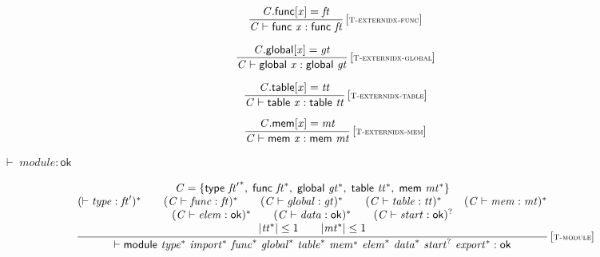 $$
\begin{array}{@{}c@{}}\displaystyle
\frac{
{\mathit{C}}.\mathsf{func}{}[{\mathit{x}}] = {\mathit{ft}}
}{
{\mathit{C}} \vdash \mathsf{func}~{\mathit{x}} : \mathsf{func}~{\mathit{ft}}
} \, {[\textsc{\scriptsize T{-}externidx{-}func}]}
\qquad
\end{array}
$$

$$
\begin{array}{@{}c@{}}\displaystyle
\frac{
{\mathit{C}}.\mathsf{global}{}[{\mathit{x}}] = {\mathit{gt}}
}{
{\mathit{C}} \vdash \mathsf{global}~{\mathit{x}} : \mathsf{global}~{\mathit{gt}}
} \, {[\textsc{\scriptsize T{-}externidx{-}global}]}
\qquad
\end{array}
$$

$$
\begin{array}{@{}c@{}}\displaystyle
\frac{
{\mathit{C}}.\mathsf{table}{}[{\mathit{x}}] = {\mathit{tt}}
}{
{\mathit{C}} \vdash \mathsf{table}~{\mathit{x}} : \mathsf{table}~{\mathit{tt}}
} \, {[\textsc{\scriptsize T{-}externidx{-}table}]}
\qquad
\end{array}
$$

$$
\begin{array}{@{}c@{}}\displaystyle
\frac{
{\mathit{C}}.\mathsf{mem}{}[{\mathit{x}}] = {\mathit{mt}}
}{
{\mathit{C}} \vdash \mathsf{mem}~{\mathit{x}} : \mathsf{mem}~{\mathit{mt}}
} \, {[\textsc{\scriptsize T{-}externidx{-}mem}]}
\qquad
\end{array}
$$

\vspace{1ex}

$\boxed{{ \vdash }\;{\mathit{module}} : \mathsf{ok}}$

$$
\begin{array}{@{}c@{}}\displaystyle
\frac{
\begin{array}{@{}c@{}}
{\mathit{C}} = \{ \begin{array}[t]{@{}l@{}}
\mathsf{type}~{{\mathit{ft}'}^\ast},\; \mathsf{func}~{{\mathit{ft}}^\ast},\; \mathsf{global}~{{\mathit{gt}}^\ast},\; \mathsf{table}~{{\mathit{tt}}^\ast},\; \mathsf{mem}~{{\mathit{mt}}^\ast} \}\end{array}
 \\
({ \vdash }\;{\mathit{type}} : {\mathit{ft}'})^\ast
 \qquad
({\mathit{C}} \vdash {\mathit{func}} : {\mathit{ft}})^\ast
 \qquad
({\mathit{C}} \vdash {\mathit{global}} : {\mathit{gt}})^\ast
 \qquad
({\mathit{C}} \vdash {\mathit{table}} : {\mathit{tt}})^\ast
 \qquad
({\mathit{C}} \vdash {\mathit{mem}} : {\mathit{mt}})^\ast
 \\
({\mathit{C}} \vdash {\mathit{elem}} : \mathsf{ok})^\ast
 \qquad
({\mathit{C}} \vdash {\mathit{data}} : \mathsf{ok})^\ast
 \qquad
({\mathit{C}} \vdash {\mathit{start}} : \mathsf{ok})^?
 \\
{|{{\mathit{tt}}^\ast}|} \leq 1
 \qquad
{|{{\mathit{mt}}^\ast}|} \leq 1
\end{array}
}{
{ \vdash }\;\mathsf{module}~{{\mathit{type}}^\ast}~{{\mathit{import}}^\ast}~{{\mathit{func}}^\ast}~{{\mathit{global}}^\ast}~{{\mathit{table}}^\ast}~{{\mathit{mem}}^\ast}~{{\mathit{elem}}^\ast}~{{\mathit{data}}^\ast}~{{\mathit{start}}^?}~{{\mathit{export}}^\ast} : \mathsf{ok}
} \, {[\textsc{\scriptsize T{-}module}]}
\qquad
\end{array}
$$

